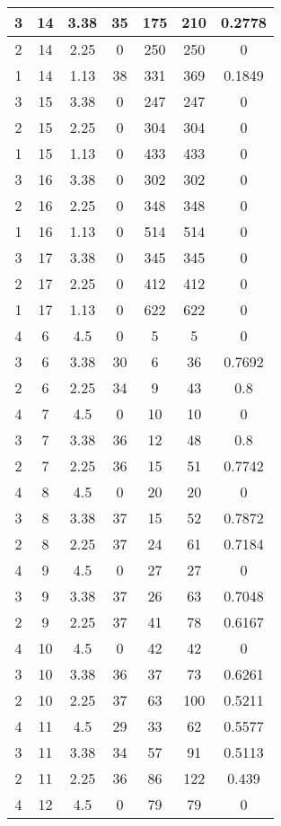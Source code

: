 \documentclass[letterpaper, 12pt]{article}
\begin{document}
\begin{longtable}{|c|c|c|c|c|c|c|}
\hline
3 & 14 & 3.38 & 35 & 175 & 210 & 0.2778 \\
\hline
2 & 14 & 2.25 & 0 & 250 & 250 & 0 \\
\hline
1 & 14 & 1.13 & 38 & 331 & 369 & 0.1849 \\
\hline
3 & 15 & 3.38 & 0 & 247 & 247 & 0 \\
\hline
2 & 15 & 2.25 & 0 & 304 & 304 & 0 \\
\hline
1 & 15 & 1.13 & 0 & 433 & 433 & 0 \\
\hline
3 & 16 & 3.38 & 0 & 302 & 302 & 0 \\
\hline
2 & 16 & 2.25 & 0 & 348 & 348 & 0 \\
\hline
1 & 16 & 1.13 & 0 & 514 & 514 & 0 \\
\hline
3 & 17 & 3.38 & 0 & 345 & 345 & 0 \\
\hline
2 & 17 & 2.25 & 0 & 412 & 412 & 0 \\
\hline
1 & 17 & 1.13 & 0 & 622 & 622 & 0 \\
\hline
4 & 6 & 4.5 & 0 & 5 & 5 & 0 \\
\hline
3 & 6 & 3.38 & 30 & 6 & 36 & 0.7692 \\
\hline
2 & 6 & 2.25 & 34 & 9 & 43 & 0.8 \\
\hline
4 & 7 & 4.5 & 0 & 10 & 10 & 0 \\
\hline
3 & 7 & 3.38 & 36 & 12 & 48 & 0.8 \\
\hline
2 & 7 & 2.25 & 36 & 15 & 51 & 0.7742 \\
\hline
4 & 8 & 4.5 & 0 & 20 & 20 & 0 \\
\hline
3 & 8 & 3.38 & 37 & 15 & 52 & 0.7872 \\
\hline
2 & 8 & 2.25 & 37 & 24 & 61 & 0.7184 \\
\hline
4 & 9 & 4.5 & 0 & 27 & 27 & 0 \\
\hline
3 & 9 & 3.38 & 37 & 26 & 63 & 0.7048 \\
\hline
2 & 9 & 2.25 & 37 & 41 & 78 & 0.6167 \\
\hline
4 & 10 & 4.5 & 0 & 42 & 42 & 0 \\
\hline
3 & 10 & 3.38 & 36 & 37 & 73 & 0.6261 \\
\hline
2 & 10 & 2.25 & 37 & 63 & 100 & 0.5211 \\
\hline
4 & 11 & 4.5 & 29 & 33 & 62 & 0.5577 \\
\hline
3 & 11 & 3.38 & 34 & 57 & 91 & 0.5113 \\
\hline
2 & 11 & 2.25 & 36 & 86 & 122 & 0.439 \\
\hline
4 & 12 & 4.5 & 0 & 79 & 79 & 0 \\

\end{longtable}
\end{document}

